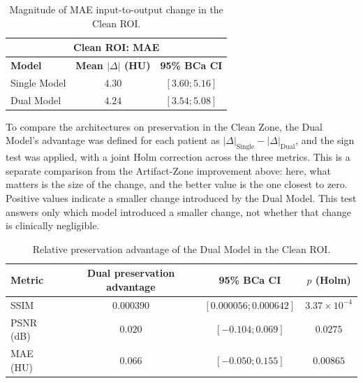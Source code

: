 \begin{table}[htbp]
\centering
\small
\begin{tabular}{lcc}
\multicolumn{3}{c}{\textbf{Clean ROI: MAE}} \\[3pt]
\toprule
\textbf{Model} & \textbf{Mean $|\Delta|$ (HU)} & \textbf{95\% BCa CI} \\
\midrule
Single Model & $4.30$ & $[3.60; 5.16]$ \\
Dual Model & $4.24$ & $[3.54; 5.08]$ \\
\bottomrule
\end{tabular}
\captionsetup{skip=2pt}
\caption[Clean-ROI MAE preservation magnitude]{Magnitude of MAE input-to-output change in the Clean ROI.}
\label{tab:roi-clean-preservation-mae}
\end{table}
\FloatBarrier
To compare the architectures on preservation in the Clean Zone, the Dual Model's advantage was defined for each patient as $|\Delta|_{\mathrm{Single}}-|\Delta|_{\mathrm{Dual}}$, and the sign test was applied, with a joint Holm correction across the three metrics. This is a separate comparison from the Artifact-Zone improvement above: here, what matters is the size of the change, and the better value is the one closest to zero. Positive values indicate a smaller change introduced by the Dual Model. This test answers only which model introduced a smaller change, not whether that change is clinically negligible.

\begin{table}[htbp]
\centering
\small
\begin{tabular}{lccc}
\toprule
\textbf{Metric} & \textbf{Dual preservation advantage} & \textbf{95\% BCa CI} & \textbf{$p$ (Holm)} \\
\midrule
SSIM & $0.000390$ & $[0.000056; 0.000642]$ & $3.37\times10^{-4}$ \\
PSNR (dB) & $0.020$ & $[-0.104; 0.069]$ & $0.0275$ \\
MAE (HU) & $0.066$ & $[-0.050; 0.155]$ & $0.00865$ \\
\bottomrule
\end{tabular}
\captionsetup{skip=2pt}
\caption[Paired Clean-ROI preservation advantage]{Relative preservation advantage of the Dual Model in the Clean ROI.}
\label{tab:roi-clean-paired-preservation}
\end{table}

